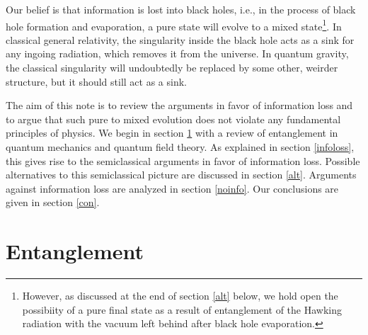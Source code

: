 \documentclass[12pt,nofootinbib,amsmath,amssymb,amsfonts,aps,prd,groupedaddress]{revtex4-1}
\begin{document}
Our belief is that information is lost into black holes, i.e., in the process of
black hole formation and evaporation, a pure state will evolve to a mixed
state\footnote{However, as discussed at the end of section \ref{alt} below, we
hold open the possibiity of a pure final state as a result of entanglement of
the Hawking radiation with the vacuum left behind after black hole
evaporation.}. In classical general relativity, the singularity inside the black hole acts as
a sink for any ingoing radiation, which removes it from the universe. In quantum gravity,
the classical singularity will undoubtedly be replaced by
some other, weirder structure, but it should still act as a sink. 

The aim of this note is to review the arguments in favor of
information loss and to argue that such pure to mixed evolution does not violate
any fundamental principles of physics. We begin in section \ref{entan} with a
review of entanglement in quantum mechanics and quantum field theory. As
explained in section \ref{infoloss}, this gives rise to the semiclassical
arguments in favor of information loss. Possible alternatives to this
semiclassical picture are discussed in section \ref{alt}. Arguments against
information loss are analyzed in section \ref{noinfo}. Our conclusions are given
in section \ref{con}.

\section{Entanglement} \label{entan}
\end{document}
